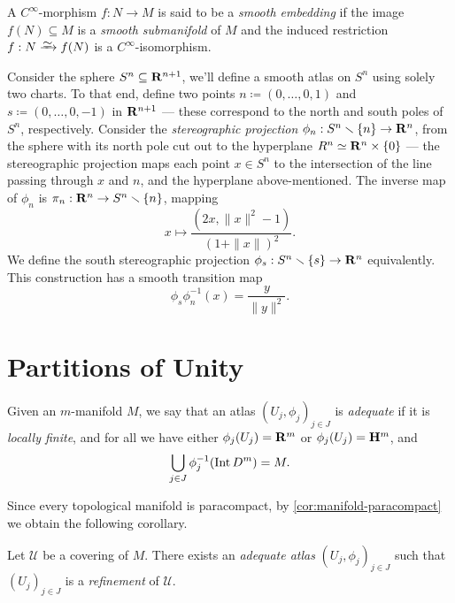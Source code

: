 \begin{definition}
\label{def:smooth-embedding}
A \(C^{\infty}\)-morphism \(f: N \to M\) is said to be a \emph{smooth embedding}
if the image \(f(N) \subseteq M\) is a \emph{smooth submanifold} of \(M\) and
the induced restriction \(f: N \isoto f(N)\) is a \(C^{\infty}\)-isomorphism.
\end{definition}

\begin{example}[Sphere]
\label{exp:sphere-smooth-manifold}
Consider the sphere \(S^n \subseteq \mathbf{R}^{n+1}\), we'll define a smooth atlas on
\(S^n\) using solely two charts. To that end, define two points
\(n \coloneq (0, \dots, 0, 1)\) and \(s \coloneq (0, \dots, 0, -1)\) in
\(\mathbf{R}^{n+1}\) --- these correspond to the north and south poles of \(S^n\),
respectively. Consider the \emph{stereographic projection}
\(\phi_n: S^n \smallsetminus \{n\} \to \mathbf{R}^n\), from the sphere with its north pole
cut out to the hyperplane \(R^n \simeq \mathbf{R}^n \times \{0\}\) --- the stereographic
projection maps each point \(x \in S^n\) to the intersection of the line passing
through \(x\) and \(n\), and the hyperplane above-mentioned. The inverse map of
\(\phi_n\) is \(\pi_n: \mathbf{R}^n \to S^n \smallsetminus \{n\}\), mapping
\[
x \longmapsto \frac{(2 x, \| x \|^2 - 1)}{(1 + \| x \|)^2}.
\]
We define the south stereographic projection \(\phi_s: S^n \smallsetminus \{s\} \to
\mathbf{R}^n\) equivalently. This construction has a smooth transition map
\[
\phi_s \phi_n^{-1}(x) = \frac{y}{\| y \|^2}.
\]
\end{example}


\section{Partitions of Unity}

\begin{definition}
\label{def:adequate-atlas}
Given an \(m\)-manifold \(M\), we say that an atlas
\((U_j, \phi_j)_{j \in J}\) is \emph{adequate} if it is \emph{locally
  finite}, and for all we have either \(\phi_j(U_j) = \mathbf{R}^m\) or
\(\phi_j(U_j) = \mathbf{H}^m\), and
\[
\bigcup_{j \in J} \phi_j^{-1}(\operatorname{Int} D^m) = M.
\]
\end{definition}

Since every topological manifold is paracompact, by
\cref{cor:manifold-paracompact} we obtain the following corollary.

\begin{corollary}
\label{cor:refinement-adequate-atlas}
Let \(\mathcal{U}\) be a covering of \(M\). There exists an \emph{adequate
  atlas} \((U_j, \phi_j)_{j \in J}\) such that \((U_j)_{j \in J}\) is
a \emph{refinement} of \(\mathcal{U}\).
\end{corollary}

